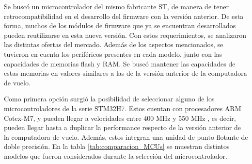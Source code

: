 Se buscó un microcontrolador del mismo fabricante ST, de manera de tener retrocompatibilidad en el desarrollo del firmware con la versión anterior. De esta forma, muchos de los módulos de firmware que ya se encuentran desarrollados pueden reutilizarse en esta nueva versión. Con estos requerimientos, se analizaron las distintas ofertas del mercado. Además de los aspectos mencionados, se tuvieron en cuenta los periféricos presentes en cada modelo, junto con las capacidades de memorias flash y RAM. Se buscó mantener las capacidades de estas memorias en valores similares a las de la versión anterior de la computadora de vuelo.

Como primera opción surgió la posibilidad de seleccionar alguno de los microcontroladores de la serie STM32H7. Estos cuentan con procesadores ARM Cotex-M7, y pueden llegar a velocidades entre 400 MHz y 550 MHz \cite{AN5293}, es decir, pueden llegar hasta a duplicar la performance respecto de la versión anterior de la computadora de vuelo. Además, estos integran una unidad de punto flotante de doble precisión. En la tabla \ref{tab:comparacion_MCUs} se muestran distintos modelos que fueron considerados durante la selección del microcontrolador.

